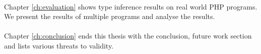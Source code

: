 \documentclass[../main.tex]{subfiles}
\begin{document}
        \paragraph{}
        Chapter \ref{ch:evaluation} shows type inference results on real world PHP programs.
        We present the results of multiple programs and analyse the results.
        
        \paragraph{}
        Chapter \ref{ch:conclusion} ends this thesis with the conclusion, future work section and lists various threats to validity.
        
        
\end{document}
